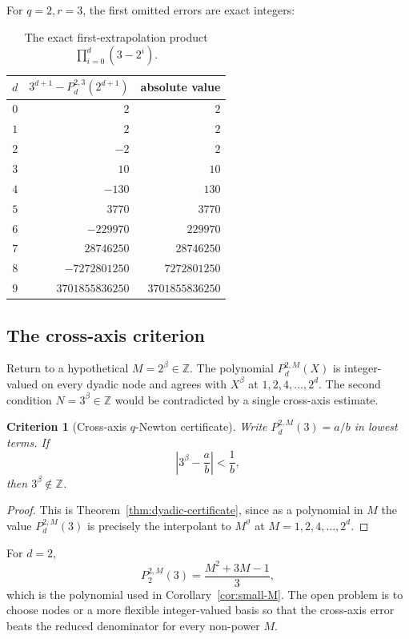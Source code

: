 \documentclass[11pt,oneside]{article}
\newtheorem{criterion}[theorem]{Criterion}
\theoremstyle{definition}
\theoremstyle{remark}
\newcommand{\Z}{\mathbb Z}
\newcommand{\thetaq}{\vartheta}
\begin{document}
For $q=2,r=3$, the first omitted errors are exact integers:

\begin{table}[ht]
\centering
\small
\begin{tabular}{r@{\qquad}r@{\qquad}r}
\toprule
$d$ & $3^{d+1}-P_d^{2,3}(2^{d+1})$ & absolute value \\
\midrule
$0$ & $2$ & $2$ \\
$1$ & $2$ & $2$ \\
$2$ & $-2$ & $2$ \\
$3$ & $10$ & $10$ \\
$4$ & $-130$ & $130$ \\
$5$ & $3770$ & $3770$ \\
$6$ & $-229970$ & $229970$ \\
$7$ & $28746250$ & $28746250$ \\
$8$ & $-7272801250$ & $7272801250$ \\
$9$ & $3701855836250$ & $3701855836250$ \\
\bottomrule
\end{tabular}
\caption{The exact first-extrapolation product
$\prod_{i=0}^d(3-2^i)$.}
\label{tab:qnewton-errors}
\end{table}

\subsection{The cross-axis criterion}

Return to a hypothetical $M=2^\beta\in\Z$.  The polynomial
$P_d^{2,M}(X)$ is integer-valued on every dyadic node and agrees with $X^\beta$ at
$1,2,4,\ldots,2^d$.  The second condition $N=3^\beta\in\Z$ would be contradicted by a single
cross-axis estimate.

\begin{criterion}[Cross-axis $q$-Newton certificate]
\label{crit:cross-axis}
Write $P_d^{2,M}(3)=a/b$ in lowest terms.  If
\[
 \left|3^\beta-\frac ab\right|<\frac1b,
\]
then $3^\beta\notin\Z$.
\end{criterion}

\begin{proof}
This is Theorem~\ref{thm:dyadic-certificate}, since as a polynomial in $M$ the value
$P_d^{2,M}(3)$ is precisely the interpolant to $M^{\thetaq}$ at
$M=1,2,4,\ldots,2^d$.
\end{proof}

For $d=2$,
\[
 P_2^{2,M}(3)=\frac{M^2+3M-1}{3},
\]
which is the polynomial used in Corollary~\ref{cor:small-M}.  The open problem is to choose
nodes or a more flexible integer-valued basis so that the cross-axis error beats the reduced
denominator for every non-power $M$.
\end{document}

